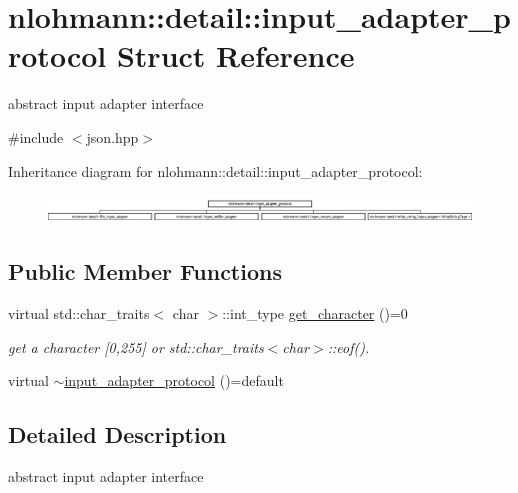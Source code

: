 \hypertarget{structnlohmann_1_1detail_1_1input__adapter__protocol}{}\section{nlohmann\+::detail\+::input\+\_\+adapter\+\_\+protocol Struct Reference}
\label{structnlohmann_1_1detail_1_1input__adapter__protocol}


abstract input adapter interface  




{\ttfamily \#include $<$json.\+hpp$>$}

Inheritance diagram for nlohmann\+::detail\+::input\+\_\+adapter\+\_\+protocol\+:\begin{figure}[H]
\begin{center}
\leavevmode
\includegraphics[height=0.742706cm]{d8/d5f/structnlohmann_1_1detail_1_1input__adapter__protocol}
\end{center}
\end{figure}
\subsection*{Public Member Functions}
\begin{DoxyCompactItemize}
\item 
virtual std\+::char\+\_\+traits$<$ char $>$\+::int\+\_\+type \mbox{\hyperlink{structnlohmann_1_1detail_1_1input__adapter__protocol_aac10a6a4048a8ce8e2ed50277692a3ca}{get\+\_\+character}} ()=0
\begin{DoxyCompactList}\small\item\em get a character \mbox{[}0,255\mbox{]} or std\+::char\+\_\+traits$<$char$>$\+::eof(). \end{DoxyCompactList}\item 
virtual \mbox{\hyperlink{structnlohmann_1_1detail_1_1input__adapter__protocol_a92dac74def4ac5adacd0684088bd4082}{$\sim$input\+\_\+adapter\+\_\+protocol}} ()=default
\end{DoxyCompactItemize}


\subsection{Detailed Description}
abstract input adapter interface 


